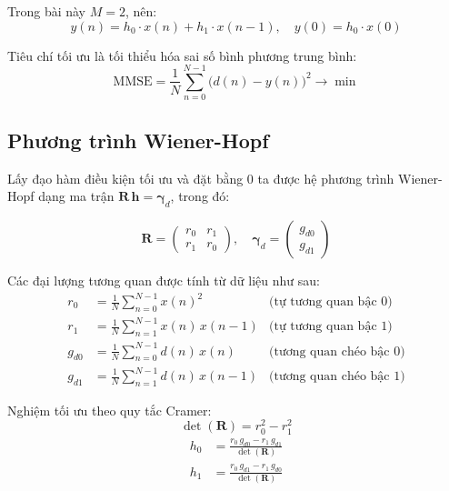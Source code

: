 \documentclass[twoside,final]{hcmut-report}
\begin{document}
Trong bài này $M = 2$, nên:
\begin{equation}
  y(n) = h_0 \cdot x(n) + h_1 \cdot x(n-1), \quad
  y(0) = h_0 \cdot x(0)
\end{equation}

Tiêu chí tối ưu là tối thiểu hóa sai số bình phương trung bình:
\begin{equation}
  \text{MMSE} = \frac{1}{N}\sum_{n=0}^{N-1}\bigl(d(n) - y(n)\bigr)^2
  \longrightarrow \min
\end{equation}

\subsection{Phương trình Wiener-Hopf}

Lấy đạo hàm điều kiện tối ưu và đặt bằng 0 ta được hệ phương trình
Wiener-Hopf dạng ma trận $\mathbf{R}\,\mathbf{h} = \boldsymbol{\gamma}_d$,
trong đó:

\begin{equation}
  \mathbf{R} = \begin{pmatrix} r_0 & r_1 \\ r_1 & r_0 \end{pmatrix}, \quad
  \boldsymbol{\gamma}_d = \begin{pmatrix} g_{d0} \\ g_{d1} \end{pmatrix}
\end{equation}

Các đại lượng tương quan được tính từ dữ liệu như sau:
\begin{align}
  r_0    &= \frac{1}{N}\sum_{n=0}^{N-1} x(n)^2
           & \text{(tự tương quan bậc 0)} \\[4pt]
  r_1    &= \frac{1}{N}\sum_{n=1}^{N-1} x(n)\,x(n-1)
           & \text{(tự tương quan bậc 1)} \\[4pt]
  g_{d0} &= \frac{1}{N}\sum_{n=0}^{N-1} d(n)\,x(n)
           & \text{(tương quan chéo bậc 0)} \\[4pt]
  g_{d1} &= \frac{1}{N}\sum_{n=1}^{N-1} d(n)\,x(n-1)
           & \text{(tương quan chéo bậc 1)}
\end{align}

Nghiệm tối ưu theo quy tắc Cramer:
\begin{equation}
  \det(\mathbf{R}) = r_0^2 - r_1^2
\end{equation}
\begin{align}
  h_0 &= \frac{r_0\,g_{d0} - r_1\,g_{d1}}{\det(\mathbf{R})} \\
  h_1 &= \frac{r_0\,g_{d1} - r_1\,g_{d0}}{\det(\mathbf{R})}
\end{align}
\end{document}
